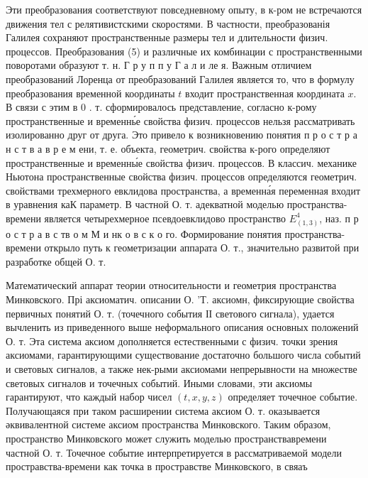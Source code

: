 \documentclass[10pt]{article}
\begin{document}
Эти преобразования соответствуют повседневному опыту, в к-ром не встречаются движения тел с релятивистскими скоростями. В частности, преобразованія Галилея сохраняют пространственные размеры тел и длительности физич. процессов. Преобразования (5) и различные их комбинации с пространственными поворотами образуют т. н. Г р у п п у Г а л и ле я. Важным отличием преобразований Лоренца от преобразований Галилея является то, что в формулу преобразования временной координаты $t$ входит пространственная координата $x$. В связи с этим в 0 . т. сформировалось представление, согласно к-рому пространственные и временнь́е свойства физич. процессов нельзя рассматривать изолированно друг от друга. Это привело к возникновению понятия п р о с т р а н с т в а в р е м ени, т. е. объекта, геометрич. свойства к-рого определяют пространственные и временны́е свойства физич. процессов. В классич. механике Ньютона пространственные свойства физич. процессов определяются геометрич. свойствами трехмерного евклидова пространства, а временна́я переменная входит в уравнения каК параметр. В частной О. т. адекватной моделью пространства-времени является четырехмерное псевдоевклидово пространство $E_{(1,3)}^{4}$, наз. п р о с т р а в с тв о м М и нк о в с к о го. Формирование понятия пространства-времени открыло путь к геометризации аппарата О. т., значительно развитой при разработке общей О. т.

Математический аппарат теории относительности и геометрия пространства Минковского. Прі аксиоматич. описании О. 'Т. аксиомн, фиксирующие свойства первичных понятий О. т. (точечного события ІІ светового сигнала), удается вычленить из приведенного выше неформального описания основных положений О. т. Эта система аксиом дополняется естественными с физич. точки зрения аксиомами, гарантирующими существование достаточно большого числа событий и световых сигналов, а также нек-рыми аксиомами непрерывности на множестве световых сигналов и точечных событий. Иными словами, эти аксиомы гарантируют, что каждый набор чисел $(t, x, y, z)$ определяет точечное событие. Получающаяся при таком расширении система аксиом О. т. оказывается әквивалентной системе аксиом пространства Минковского. Таким образом, пространство Минковского может служить моделью пространствавремени частной О. т. Точечное событие интерпретируется в рассматриваемой модели простравства-времени как точка в простравстве Минковского, в свяаъ
\end{document}
